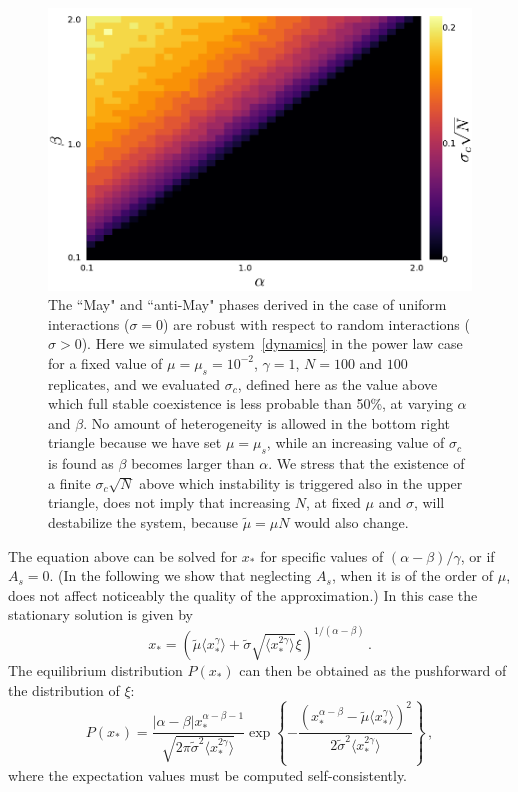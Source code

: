 \documentclass[
 prl,
 twocolumn,
 amsmath,
 amssymb,
 aps,
]{revtex4-2}
\begin{document}
\begin{figure}[t!]
    \includegraphics[width=.45\textwidth]{alpha-beta.pdf}
    \caption{The ``May" and ``anti-May" phases derived in the
    case of uniform interactions ($\sigma = 0$) are robust with respect to random interactions ($\sigma > 0$).
    Here we simulated system~\eqref{dynamics} in the power law case for a fixed value of
    $\mu=\mu_s=10^{-2}$, $\gamma=1$, $N=100$ and $100$ replicates,  
    and we evaluated $\sigma_c$, defined here as
    the value above which full stable coexistence is less probable than 50\%,
    at varying $\alpha$ and $\beta$.
    No amount of heterogeneity is allowed in the bottom right triangle because we have set $\mu=\mu_s$, while an increasing value of $\sigma_c$
    is found as $\beta$ becomes larger than $\alpha$.
    We stress that the existence of a finite $\sigma_c\sqrt{N}$ above which instability is triggered also in the upper triangle,
    does not imply that increasing $N$, at fixed $\mu$ and $\sigma$, will destabilize the system, because $\tilde{\mu}=\mu N$ would also change.
    }
    \label{fig: alpha-beta}
\end{figure}
The equation above can be solved for $x_*$ for specific values of
$(\alpha-\beta)/\gamma$, or if $A_s=0$.
(In the following we show that neglecting $A_s$, when it is of the order of $\mu$, does not affect noticeably the quality of the approximation.) In this case the stationary solution is given by 
\begin{equation} \label{eq: cavity solution}
    x_* = \left( \tilde{\mu} \langle x_*^{\gamma}\rangle + \tilde{\sigma} \sqrt{\langle x_*^{2\gamma}\rangle}\xi\right)^{1/(\alpha-\beta)} \, .
\end{equation}
The equilibrium distribution $P(x_*)$ can then be obtained as the pushforward of the distribution of $\xi$: 
\begin{equation}\label{eq: dist general}
    P(x_*)=\frac{|\alpha-\beta|x_*^{\alpha-\beta-1}}{\sqrt{2\pi\tilde{\sigma}^2 \langle x_*^{2\gamma}\rangle}}
    \exp{\left\{-\frac{(x_*^{\alpha-\beta}- \tilde{\mu} \langle x_*^{\gamma}\rangle)^2}{2\tilde{\sigma}^2\langle x_*^{2\gamma}\rangle}\right\}} \, ,
\end{equation}
where the expectation values must be computed self-consistently. 
\end{document}
